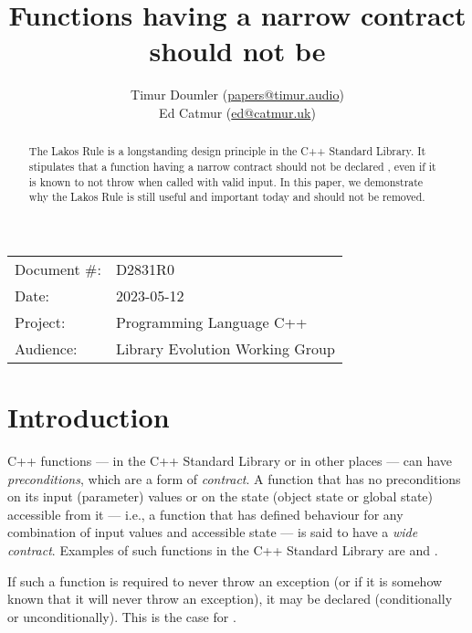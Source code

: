 


\title{Functions having a narrow contract should not be }
\author{ Timur Doumler \small(\href{mailto:papers@timur.audio}{papers@timur.audio})   \\
Ed Catmur \small(\href{mailto:ed@catmur.uk}{ed@catmur.uk})  }
\date{}
\maketitle

\begin{tabular}{ll}
Document \#: & D2831R0 \\
Date: &2023-05-12 \\
Project: & Programming Language C++ \\
Audience: & Library Evolution Working Group
\end{tabular}

\begin{abstract}
The Lakos Rule is a longstanding design principle in the C++ Standard Library. It stipulates that a function having a narrow contract should not be declared , even if it is known to not throw when called with valid input. In this paper, we demonstrate why the Lakos Rule is still useful and important today and should not be removed.
\end{abstract}

\section{Introduction}
\label{sec:intro}

C++ functions --- in the C++ Standard Library or in other places --- can have \emph{preconditions}, which are a form of \emph{contract}. A function that has no preconditions on its input (parameter) values or on the state (object state or global state) accessible from it --- i.e., a function that has defined behaviour for any combination of input values and accessible state --- is said to have a \emph{wide contract}. Examples of such functions in the C++ Standard Library are  and .

If such a function is required to never throw an exception (or if it is somehow known that it will never throw an exception), it may be declared  (conditionally or unconditionally). This is the case for .

